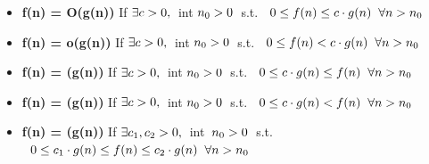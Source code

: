 \begin{definitionblock}
    \begin{itemize}
        \item \textbf{f(n) = O(g(n))} \newline If $\exists c > 0, \hspace{0.2cm}$int$ \hspace{0.1cm} n_0 > 0 \hspace{0.2cm}$s.t. $\hspace{0.2cm} 0 \leq f(n) \leq c\cdot g(n) \hspace{0.2cm} \forall n > n_0$
        \item \textbf{f(n) = o(g(n))} \newline If $\exists c > 0, \hspace{0.2cm}$int$ \hspace{0.1cm} n_0 > 0 \hspace{0.2cm}$s.t. $\hspace{0.2cm} 0 \leq f(n) < c\cdot g(n) \hspace{0.2cm} \forall n > n_0$
        \item \textbf{f(n) = \Omega(g(n))} \newline If $\exists c > 0, \hspace{0.2cm}$int$ \hspace{0.1cm} n_0 > 0 \hspace{0.2cm}$s.t. $\hspace{0.2cm} 0 \leq c\cdot g(n) \leq f(n) \hspace{0.2cm} \forall n > n_0$
        \item \textbf{f(n) = \omega(g(n))} \newline If $\exists c > 0, \hspace{0.2cm}$int$ \hspace{0.1cm} n_0 > 0 \hspace{0.2cm}$s.t. $\hspace{0.2cm} 0 \leq c\cdot g(n) < f(n) \hspace{0.2cm} \forall n > n_0$
        \item \textbf{f(n) = \Theta(g(n))} \newline If $\exists c_1,c_2 > 0, \hspace{0.2cm}$int$ \hspace{0.2cm} n_0 > 0 \hspace{0.2cm}$s.t. $\hspace{0.2cm} 0 \leq c_1\cdot g(n) \leq f(n) \leq c_2\cdot g(n) \hspace{0.2cm} \forall n > n_0$
    \end{itemize}
\end{definitionblock}

